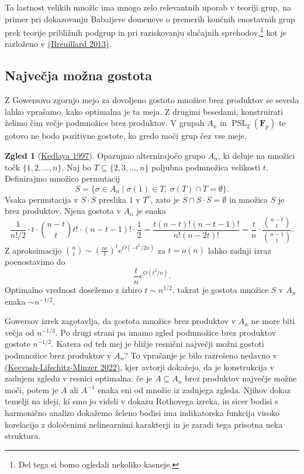 \documentclass[11pt]{book}
\def\FF{\mathbf{F}}
\DeclareMathOperator\PSL{PSL}
\theoremstyle{definition}
\theoremstyle{zgled}
\newtheorem*{zgled}{Zgled}
\theoremstyle{odprtproblem}
\theoremstyle{domacanaloga}
\theoremstyle{izrek}
\begin{document}
Ta lastnost velikih množic ima mnogo zelo relevantnih uporab v teoriji grup, na primer pri dokazovanju Babaijeve domeneve o premerih končnih enostavnih grup prek teorije približnih podgrup in pri raziskovanju slučajnih sprehodov,\footnote{Del tega si bomo ogledali nekoliko kasneje.} kot je razloženo v \href{http://library.msri.org/books/Book61/files/15breu.pdf}{(Breuillard 2013)}.

\subsection{Največja možna gostota}

Z Gowersovo zgornjo mejo za dovoljeno gostoto množice brez produktov se seveda lahko vprašamo, kako optimalna je ta meja. Z drugimi besedami, konstruirati želimo čim večje podmnožice brez produktov. V grupah $A_n$ in $\PSL_2(\FF_p)$ te gotovo ne bodo pozitivne gostote, ko gredo moči grup čez vse meje.

\begin{zgled}[\href{https://www.sciencedirect.com/science/article/pii/S0097316597927151}{Kedlaya 1997}]
Opazujmo alternirajočo grupo $A_n$, ki deluje na množici točk $\{ 1, 2, \dots, n \}$. Naj bo $T \subseteq \{2,3,\dots,n \}$ poljubna podmnožica velikosti $t$. Definirajmo množico permutacij
\[
S = \{ \sigma \in A_n \mid \sigma(1) \in T, \ \sigma(T) \cap T = \emptyset \}.
\]
Vsaka permutacija v $S \cdot S$ preslika $1$ v $T^c$, zato je $S \cap S \cdot S = \emptyset$ in množica $S$ je brez produktov. Njena gostota v $A_n$ je enaka
\[
  \frac{1}{n!/2} \cdot t \cdot \binom{n-t}{t} t! \cdot (n-t-1)! \cdot \frac{1}{2}
  = \frac{t (n-t)! (n-t-1)!}{n!(n-2t)!}
  = \frac{t}{n} \cdot \frac{\binom{n-t}{t}}{\binom{n-1}{t}}.
\]
Z aproksimacijo $\binom{n}{t} \sim (\frac{ne}{t})^t e^{O(- t^2/2n)}$ za $t = o(n)$ lahko zadnji izraz poenostavimo do 
\[
    \frac{t}{n} e^{O(t^2/n)}.
\]
Optimalno vrednost dosežemo z izbiro $t \sim n^{1/2}$, takrat je gostota množice $S$ v $A_n$ enaka $\sim n^{-1/2}$. 
\end{zgled}

Gowersov izrek zagotavlja, da gostota množice brez produktov v $A_n$ ne more biti večja od $n^{-1/3}$. Po drugi strani pa imamo zgled podmnožice brez produktov gostote $n^{-1/2}$. Katera od teh mej je bližje resnični največji možni gostoti podmnožice brez produktov v $A_n$? To vprašanje je bilo razrešeno nedavno v \href{https://arxiv.org/abs/2205.15191}{(Keevash-Lifschitz-Minzer 2022)}, kjer avtorji dokažejo, da je konstrukcija v zadnjem zgledu v resnici optimalna: če je $A \subseteq A_n$ brez produktov največje možne moči, potem je $A$ ali $A^{-1}$ enaka eni od množic iz zadnjega zgleda. Njihov dokaz temelji na ideji, ki smo jo videli v dokazu Rothovega izreka, in sicer bodisi s harmonično analizo dokažemo želeno bodisi ima indikatorska funkcija visoko korelacijo z določenimi nelinearnimi karakterji in je zaradi tega prisotna neka struktura.
\end{document}
